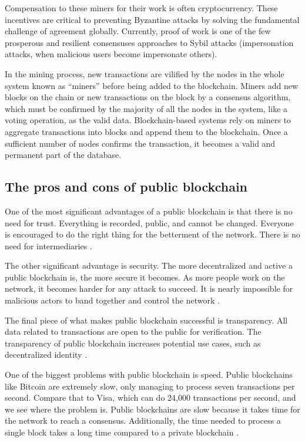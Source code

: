 Compensation to these miners for their work is often cryptocurrency. These incentives are critical to preventing Byzantine attacks by solving the fundamental challenge of agreement globally. Currently, proof of work is one of the few prosperous and resilient consensuses approaches to Sybil attacks \cite{douceur2002sybil} (impersonation attacks, when malicious users become impersonate others).

In the mining process, new transactions are vilified by the nodes in the whole system known as “miners” before being added to the blockchain. Miners add new blocks on the chain or new transactions on the block by a consensus algorithm, which must be confirmed by the majority of all the nodes in the system, like a voting operation, as the valid data. Blockchain-based systems rely on miners to aggregate transactions into blocks and append them to the blockchain. Once a sufficient number of nodes confirms the transaction, it becomes a valid and permanent part of the database. 

\subsection{The pros and cons of public blockchain}\label{sec:prosConsPub}

One of the most significant advantages of a public blockchain is that there is no need for trust. Everything is recorded, public, and cannot be changed. Everyone is encouraged to do the right thing for the betterment of the network. There is no need for intermediaries \cite{blockgeeks2018deeper}.

The other significant advantage is security. The more decentralized and active a public blockchain is, the more secure it becomes. As more people work on the network, it becomes harder for any attack to succeed. It is nearly impossible for malicious actors to band together and control the network \cite{selfkeyOrg}.

The final piece of what makes public blockchain successful is transparency. All data related to transactions are open to the public for verification. The transparency of public blockchain increases potential use cases, such as decentralized identity \cite{Comstor2018}.

One of the biggest problems with public blockchain is speed. Public blockchains like Bitcoin are extremely slow, only managing to process seven transactions per second. Compare that to Visa, which can do 24,000 transactions per second, and we see where the problem is. Public blockchains are slow because it takes time for the network to reach a consensus. Additionally, the time needed to process a single block takes a long time compared to a private blockchain \cite{blockgeeks2018deeper}.

